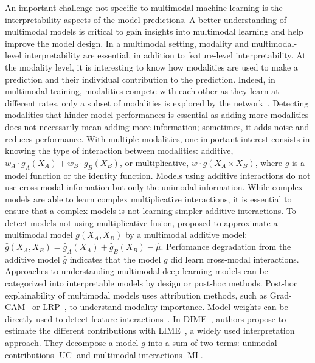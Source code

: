 \documentclass[../main.tex]{subfiles}
\begin{document}
	An important challenge not specific to multimodal machine learning is the interpretability aspects of the model predictions.
	A better understanding of multimodal models is critical to gain insights into multimodal learning and help improve the model design.
	In a multimodal setting, modality and multimodal-level interpretability are essential, in addition to feature-level interpretability.
	At the modality level, it is interesting to know how modalities are used to make a prediction and their individual contribution to the prediction.
	Indeed, in multimodal training, modalities compete with each other as they learn at different rates, only a subset of modalities is explored by the network~\cite{pmlr-v162-huang22e}.
	Detecting modalities that hinder model performances is essential as adding more modalities does not necessarily mean adding more information; sometimes, it adds noise and reduces performance.
	With multiple modalities, one important interest consists in knowing the type of interaction between modalities: additive, \( w_A\cdot g_A\left(X_A\right) + w_B\cdot g_B\left(X_B\right)\),  or multiplicative, \(w\cdot  g\left( X_A \times X_B\right)\), where \(g\) is a model function or the identity function.
	Models using additive interactions do not use cross-modal information but only the unimodal information.
	While complex models are able to learn complex multiplicative interactions, it is essential to ensure that a complex models is not learning simpler additive interactions.
	To detect models not using multiplicative fusion, \citeauthor{EMAP} proposed to approximate a multimodal model \(g\left(X_A,X_B\right)\) by a multimodal additive model: \(\hat{g}\left(X_A,X_B\right) = \hat{g}_A\left(X_A\right) + \hat{g}_B\left(X_B\right) - \hat{\mu}\).
	Perfomance degradation from the additive model \(\hat{g}\) indicates that the model \(g\) did learn cross-modal interactions.
	Approaches to understanding multimodal deep learning models can be categorized into interpretable models by design or post-hoc methods.
	Post-hoc explainability of multimodal models uses attribution methods, such as Grad-CAM~\cite{Chandrasekaran2018DoEM} or LRP~\cite{Ellis2021}, to understand modality importance.
	Model weights can be directly used to detect feature interactions~\cite{tsang2017detecting}.
	In DIME~\cite{DIME}, authors propose to estimate the different contributions with LIME~\cite{LIME}, a widely used interpretation approach.
	They decompose a model \(g\) into a sum of two terms: unimodal contributions \(\operatorname{UC}\) and multimodal interactions \(\operatorname{MI}\).
\end{document}
